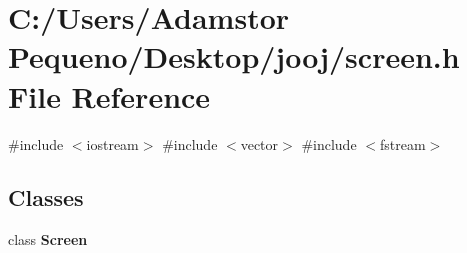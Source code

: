\section{C\+:/\+Users/\+Adamstor Pequeno/\+Desktop/jooj/screen.h File Reference}
\label{screen_8h}
{\ttfamily \#include $<$iostream$>$}\newline
{\ttfamily \#include $<$vector$>$}\newline
{\ttfamily \#include $<$fstream$>$}\newline
\subsection*{Classes}
\begin{DoxyCompactItemize}
\item 
class \textbf{ Screen}
\end{DoxyCompactItemize}
